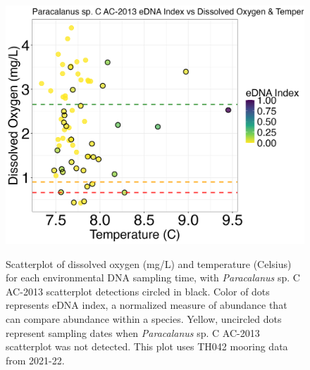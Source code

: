 \documentclass[12pt,twoside]{reedthesis}
\begin{document}
{		\begin{figure}[!h]
		\begin{center}
			\includegraphics[scale=0.3]{Paracalanus_Scatter_noOut} \\
			\caption[\textit{Paracalanus} sp. C AC-2013 scatterplot]{\footnotesize{Scatterplot of dissolved oxygen (mg/L) and temperature (Celsius) for each environmental DNA sampling time, with \textit{Paracalanus} sp. C AC-2013 scatterplot detections circled in black. Color of dots represents eDNA index, a normalized measure of abundance that can compare abundance within a species. Yellow, uncircled dots represent sampling dates when \textit{Paracalanus} sp. C AC-2013 scatterplot was not detected. This plot uses TH042 mooring data from 2021-22.}} %
			\label{ParacalanusScatterApp}
		\end{center}
	\end{figure} 
	
}
\end{document}
